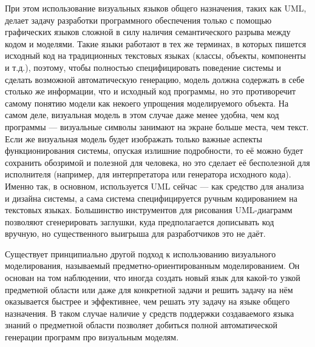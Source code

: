 При этом использование визуальных языков общего назначения, таких как UML, делает задачу 
разработки программного обеспечения только с помощью графических языков сложной
в силу наличия семантического разрыва между кодом и моделями. Такие языки работают в 
тех же терминах, в которых пишется исходный код на традиционных текстовых языках 
(классы, объекты, компоненты и т.д.), поэтому, чтобы полностью специфицировать 
поведение системы и сделать возможной автоматическую генерацию, модель должна 
содержать в себе столько же информации, что и исходный код программы, но это 
противоречит самому понятию модели как некоего упрощения моделируемого объекта. 
На самом деле, визуальная модель в этом случае даже менее удобна, чем код 
программы --- визуальные символы занимают на экране больше места, чем текст. 
Если же визуальная модель будет изображать только важные аспекты 
функционирования системы, опуская излишние подробности, то её можно будет 
сохранить обозримой и полезной для человека, но это сделает её бесполезной для 
исполнителя (например, для интерпретатора или генератора исходного кода). 
Именно так, в основном, используется UML сейчас --- как средство для анализа и 
дизайна системы, а сама система специфицируется ручным кодированием на текстовых 
языках. Большинство инструментов для рисования UML-диаграмм позволяют 
сгенерировать заглушки, куда предполагается дописывать код вручную, но 
существенного выигрыша для разработчиков это не даёт.

Существует принципиально другой подход к использованию визуального 
моделирования, называемый предметно-ориентированным моделированием. Он основан на том наблюдении, что иногда создать новый 
язык для какой-то узкой предметной области или даже для конкретной задачи и решить задачу 
на нём оказывается быстрее и эффективнее, чем решать эту задачу на языке общего назначения. 
В таком случае наличие у средств поддержки создаваемого языка знаний о предметной области 
позволяет добиться полной автоматической генерации программ про визуальным моделям.


